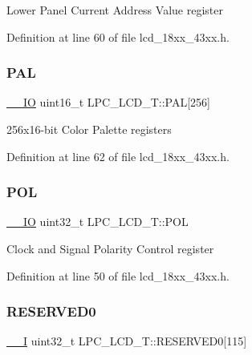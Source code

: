 Lower Panel Current Address Value register 

Definition at line 60 of file lcd\+\_\+18xx\+\_\+43xx.\+h.

\mbox{\label{struct_l_p_c___l_c_d___t_ad56d1a3df778dbb02742ad97c27731eb}} 
\subsubsection{\texorpdfstring{P\+AL}{PAL}}
{\footnotesize\ttfamily \hyperlink{core__sc300_8h_aec43007d9998a0a0e01faede4133d6be}{\+\_\+\+\_\+\+IO} uint16\+\_\+t L\+P\+C\+\_\+\+L\+C\+D\+\_\+\+T\+::\+P\+AL\mbox{[}256\mbox{]}}

256x16-\/bit Color Palette registers 

Definition at line 62 of file lcd\+\_\+18xx\+\_\+43xx.\+h.

\mbox{\label{struct_l_p_c___l_c_d___t_a8674d4394f14a657cbc37e8cbea49c1d}} 
\subsubsection{\texorpdfstring{P\+OL}{POL}}
{\footnotesize\ttfamily \hyperlink{core__sc300_8h_aec43007d9998a0a0e01faede4133d6be}{\+\_\+\+\_\+\+IO} uint32\+\_\+t L\+P\+C\+\_\+\+L\+C\+D\+\_\+\+T\+::\+P\+OL}

Clock and Signal Polarity Control register 

Definition at line 50 of file lcd\+\_\+18xx\+\_\+43xx.\+h.

\mbox{\label{struct_l_p_c___l_c_d___t_a07b6e0e0460eefa43ec6c1883240a024}} 
\subsubsection{\texorpdfstring{R\+E\+S\+E\+R\+V\+E\+D0}{RESERVED0}}
{\footnotesize\ttfamily \hyperlink{core__sc300_8h_af63697ed9952cc71e1225efe205f6cd3}{\+\_\+\+\_\+I} uint32\+\_\+t L\+P\+C\+\_\+\+L\+C\+D\+\_\+\+T\+::\+R\+E\+S\+E\+R\+V\+E\+D0\mbox{[}115\mbox{]}}



